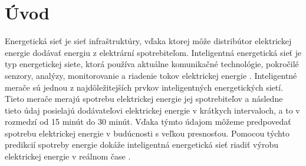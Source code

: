 \chapter*{Úvod} %











Energetická sieť je sieť infraštruktúry, vďaka ktorej môže distribútor elektrickej energie dodávať energiu z elektrární spotrebiteľom. Inteligentná energetická sieť je typ energetickej siete, ktorá používa aktuálne komunikačné technológie, pokročilé senzory, analýzy, monitorovanie a riadenie tokov elektrickej energie \cite{smartgrid0book}. Inteligentné merače sú jednou z najdôležitejších prvkov inteligentných energetických sietí. Tieto merače merajú spotrebu elektrickej energie jej spotrebiteľov a následne tieto údaj posielajú dodávateľovi elektrickej energie v krátkych intervaloch, a to v rozmedzí od 15 minút do 30 minút. Vďaka týmto údajom môžeme predpovedať spotrebu elektrickej energie v budúcnosti s veľkou presnosťou. Pomocou týchto predikcií spotreby energie dokáže inteligentná energetická sieť riadiť výrobu elektrickej energie v reálnom čase \cite{smartmeterpublication, smartmetergeneral}. 



